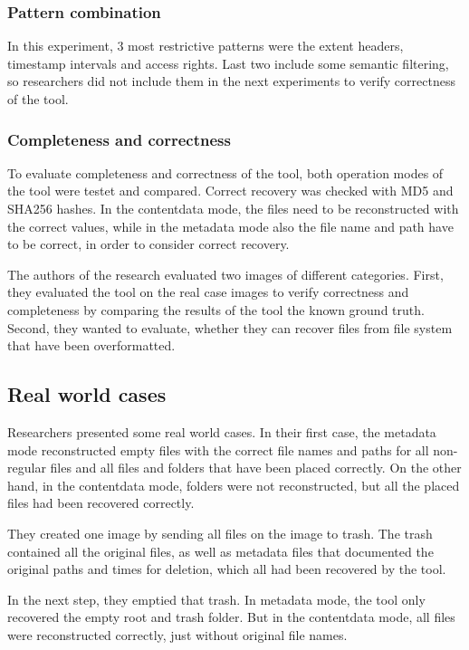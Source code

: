 \documentclass{acm_proc_article-sp}
\begin{document}
\subsubsection{Pattern combination}

In this experiment, 3 most restrictive patterns were the extent headers, timestamp intervals and access rights. Last two include some semantic filtering, so researchers did not include them in the next experiments to verify correctness of the tool.

\subsubsection{Completeness and correctness}

To evaluate completeness and correctness of the tool, both operation modes of the tool were testet and compared. Correct recovery was checked with MD5 and SHA256 hashes. In the contentdata mode, the files need to be reconstructed with the correct values, while in the metadata mode also the file name and path have to be correct, in order to consider correct recovery.

The authors of the research evaluated two images of different categories. First, they evaluated the tool on the real case images to verify correctness and completeness by comparing the results of the tool the known ground truth. Second, they wanted to evaluate, whether they can recover files from file system that have been overformatted.

\subsection{Real world cases}

Researchers presented some real world cases. In their first case, the metadata mode reconstructed empty files with the correct file names and paths for all non-regular files and all files and folders that have been
placed correctly. On the other hand, in the contentdata mode, folders were not reconstructed, but all the placed files had been recovered correctly.

They created one image by sending all files on the image to trash. The trash contained all the original files, as well as metadata files that documented the original paths and times for deletion, which all had been recovered by the tool.

In the next step, they emptied that trash. In metadata mode, the tool only recovered the empty root and trash folder. But in the contentdata mode, all files were reconstructed correctly, just without original file names. 
\end{document}
